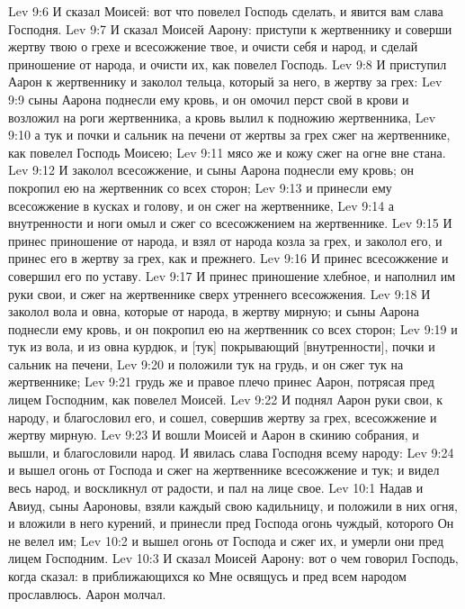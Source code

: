 \vs Lev 9:6 И сказал Моисей: вот что повелел Господь сделать, и явится вам слава Господня.
\vs Lev 9:7 И сказал Моисей Аарону: приступи к жертвеннику и соверши жертву твою о грехе и всесожжение твое, и очисти себя и народ, и сделай приношение от народа, и очисти их, как повелел Господь.
\rsbpar\vs Lev 9:8 И приступил Аарон к жертвеннику и заколол тельца, который за него, в жертву за грех:
\vs Lev 9:9 сыны Аарона поднесли ему кровь, и он омочил перст свой в крови и возложил на роги жертвенника, а  кровь вылил к подножию жертвенника,
\vs Lev 9:10 а тук и почки и сальник на печени от жертвы за грех сжег на жертвеннике, как повелел Господь Моисею;
\vs Lev 9:11 мясо же и кожу сжег на огне вне стана.
\vs Lev 9:12 И заколол всесожжение, и сыны Аарона поднесли ему кровь; он покропил ею на жертвенник со всех сторон;
\vs Lev 9:13 и принесли ему всесожжение в кусках и голову, и он сжег на жертвеннике,
\vs Lev 9:14 а внутренности и ноги омыл и сжег со всесожжением на жертвеннике.
\vs Lev 9:15 И принес приношение от народа, и взял от народа козла за грех, и заколол его, и принес его в жертву за грех, как и прежнего.
\vs Lev 9:16 И принес всесожжение и совершил его по уставу.
\vs Lev 9:17 И принес приношение хлебное, и наполнил им руки свои, и сжег на жертвеннике сверх утреннего всесожжения.
\vs Lev 9:18 И заколол вола и овна, которые от народа, в жертву мирную; и сыны Аарона поднесли ему кровь, и он покропил ею на жертвенник со всех сторон;
\vs Lev 9:19  и тук из вола, и из овна курдюк, и [тук] покрывающий [внутренности], почки и сальник на печени,
\vs Lev 9:20 и положили тук на грудь, и он сжег тук на жертвеннике;
\vs Lev 9:21 грудь же и правое плечо принес Аарон, потрясая пред лицем Господним, как повелел Моисей.
\vs Lev 9:22 И поднял Аарон руки свои,  к народу, и благословил его, и сошел, совершив жертву за грех, всесожжение и жертву мирную.
\vs Lev 9:23 И вошли Моисей и Аарон в скинию собрания, и вышли, и благословили народ. И явилась слава Господня всему народу:
\vs Lev 9:24 и вышел огонь от Господа и сжег на жертвеннике всесожжение и тук; и видел весь народ, и воскликнул от радости, и пал на лице свое.
\vs Lev 10:1 Надав и Авиуд, сыны Аароновы, взяли каждый свою кадильницу, и положили в них огня, и вложили в него курений, и принесли пред Господа огонь чуждый, которого Он не велел им;
\vs Lev 10:2 и вышел огонь от Господа и сжег их, и умерли они пред лицем Господним.
\vs Lev 10:3 И сказал Моисей Аарону: вот о чем говорил Господь, когда сказал: в приближающихся ко Мне освящусь и пред всем народом прославлюсь. Аарон молчал.
